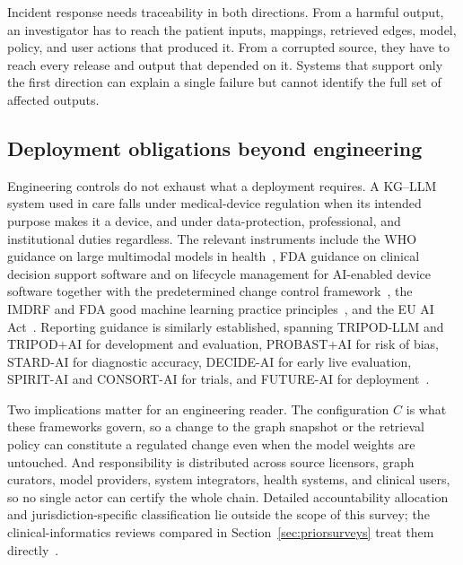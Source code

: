 Incident response needs traceability in both directions. From a harmful output, an investigator has to reach the patient inputs, mappings, retrieved edges, model, policy, and user actions that produced it. From a corrupted source, they have to reach every release and output that depended on it. Systems that support only the first direction can explain a single failure but cannot identify the full set of affected outputs.

\subsection{Deployment obligations beyond engineering}

Engineering controls do not exhaust what a deployment requires. A KG--LLM system used in care falls under medical-device regulation when its intended purpose makes it a device, and under data-protection, professional, and institutional duties regardless. The relevant instruments include the WHO guidance on large multimodal models in health~\cite{who2024lmm}, FDA guidance on clinical decision support software and on lifecycle management for AI-enabled device software together with the predetermined change control framework~\cite{fdacds2026,fdalifecycle2025,fdapccp2025}, the IMDRF and FDA good machine learning practice principles~\cite{gmlp2025}, and the EU AI Act~\cite{euaiact2024}. Reporting guidance is similarly established, spanning TRIPOD-LLM and TRIPOD+AI for development and evaluation, PROBAST+AI for risk of bias, STARD-AI for diagnostic accuracy, DECIDE-AI for early live evaluation, SPIRIT-AI and CONSORT-AI for trials, and FUTURE-AI for deployment~\cite{gallifant2025tripodllm,collins2024tripodai,moons2025probastai,sounderajah2025stardai,vasey2022decideai,rivera2020spiritai,liu2020consortai,lekadir2025futureai}.

Two implications matter for an engineering reader. The configuration $C$ is what these frameworks govern, so a change to the graph snapshot or the retrieval policy can constitute a regulated change even when the model weights are untouched. And responsibility is distributed across source licensors, graph curators, model providers, system integrators, health systems, and clinical users, so no single actor can certify the whole chain. Detailed accountability allocation and jurisdiction-specific classification lie outside the scope of this survey; the clinical-informatics reviews compared in Section~\ref{sec:priorsurveys} treat them directly~\cite{murali2026integrating,liu2025biomedrag}.
